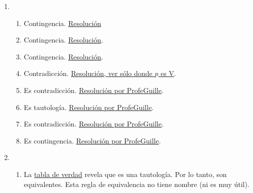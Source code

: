 \documentclass[a4paper]{article}
\newcommand{\exercise}{\item}
\newcommand{\then}{\to}
\newcommand{\eq}{\leftrightarrow}
\begin{document}
\begin{enumerate}
\begin{enumerate} [label=(\alph*)]
		\item Una opcion simple es $\neg p  \land  r$ con $p$:"\textit{Calavera chilla}" y $q$:"\textit{Piola se la banca}". Pero podríamos tener $( p\then q )  \land  ( r\then s )$ considerando $p$:"\textit{Alguien es calavera}", $q$:"\textit{Alguien chilla}", $q$:"\textit{Alguien es piola}" y $q$:"\textit{Alguien se la banca}"
		\item $( p  \land  q ) \then  ( r \lor  s )$ con $p$:"\textit{Vine en tren}", $q$:"\textit{Suspendieron el servicio}", $r$:"\textit{Tengo que volver en colectivo}" y $s$:"\textit{Tengo que volver caminando}".
		\item $( p  \land  q )  \land  r  \land  s $. $p$:"\textit{En un juego son importantes las mecánicas}", $q$:"\textit{En un juego es importantes la historia}", $r$:"\textit{Las mecánicas mantienen a la persona jugadora activa}" y $s$:"\textit{La historia la mantiene interesada}".
		\item $( q \then  p ) \eq  ( p \lor  \neg q)$ con $p$:"\textit{Los fantasmas se ponen azules}" y $q$:"\textit{El pacman come la fruta}".
\end{enumerate}\exercise\begin{enumerate} [label=(\alph*)]		\item Contingencia. \href{https://www.wolframalpha.com/input?i=p+or++%28not+q+xor++r%29}{Resolución}
		\item Contingencia. \href{https://www.wolframalpha.com/input?i=p+and++q+or++r}{Resolución}.
		\item Contingencia. \href{https://www.wolframalpha.com/input?i=not+%28p+%3D%3E+%28q+and++r%29%29}{Resolución}.
		\item Contradicción. \href{https://www.wolframalpha.com/input?i=not+%28%28p+nor+q%29+%3D%3E+r%29}{Resolución, ver sólo donde $p$ es V}.
		\item Es contradicción. \href{https://youtu.be/n_t1f0xa3D0?t=413}{Resolución por ProfeGuille}.
		\item Es tautología. \href{https://youtu.be/n_t1f0xa3D0?t=643}{Resolución por ProfeGuille}.
		\item Es contradicción. \href{https://youtu.be/rlJmcBGdOoY}{Resolución por ProfeGuille}.
		\item Es contingencia. \href{https://youtu.be/n_t1f0xa3D0?t=40}{Resolución por ProfeGuille}.
\end{enumerate}\exercise\begin{enumerate} [label=(\alph*)]		\item La \href{https://www.wolframalpha.com/input?i=truth+table%3A%28not+p+%3D%3E+p%29+%3C%3D%3E+p}{tabla de verdad} revela que es una tautología. Por lo tanto, son equivalentes. Esta regla de equivalencia no tiene nombre (ni es muy útil). 

\end{enumerate}
\end{enumerate}
\end{document}
